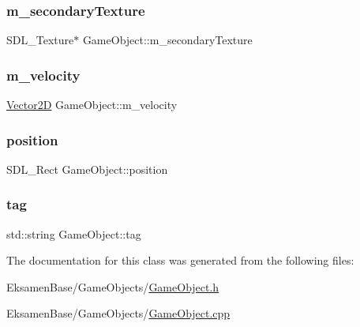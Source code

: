 \mbox{\label{class_game_object_aa89e916d62813d047b054c0c9cf97559}} 
\subsubsection{\texorpdfstring{m\+\_\+secondary\+Texture}{m\_secondaryTexture}}
{\footnotesize\ttfamily S\+D\+L\+\_\+\+Texture$\ast$ Game\+Object\+::m\+\_\+secondary\+Texture\hspace{0.3cm}{\ttfamily [protected]}}

\mbox{\label{class_game_object_ac27549efb645f7c924d6604e318877bf}} 
\subsubsection{\texorpdfstring{m\+\_\+velocity}{m\_velocity}}
{\footnotesize\ttfamily \mbox{\hyperlink{struct_game_object_1_1_vector2_d}{Vector2D}} Game\+Object\+::m\+\_\+velocity\hspace{0.3cm}{\ttfamily [protected]}}

\mbox{\label{class_game_object_af6009d73be98a4bd54272d06b50f2eac}} 
\subsubsection{\texorpdfstring{position}{position}}
{\footnotesize\ttfamily S\+D\+L\+\_\+\+Rect Game\+Object\+::position}

\mbox{\label{class_game_object_a66891b8bfd67373dde0155ae7808bbb4}} 
\subsubsection{\texorpdfstring{tag}{tag}}
{\footnotesize\ttfamily std\+::string Game\+Object\+::tag}



The documentation for this class was generated from the following files\+:\begin{DoxyCompactItemize}
\item 
Eksamen\+Base/\+Game\+Objects/\mbox{\hyperlink{_game_object_8h}{Game\+Object.\+h}}\item 
Eksamen\+Base/\+Game\+Objects/\mbox{\hyperlink{_game_object_8cpp}{Game\+Object.\+cpp}}\end{DoxyCompactItemize}
